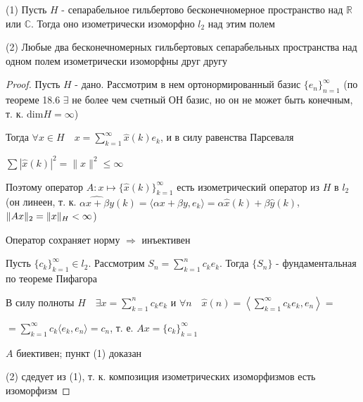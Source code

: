 \documentclass[a4paper,12pt]{report}
\newcommand*{\hm}[1]{#1\nobreak\discretionary{}%
            {\hbox{$\mathsurround=0pt #1$}}{}}
\begin{document}
\begin{thm}
(1) Пусть $H$ - сепарабельное гильбертово бесконечномерное пространство над $\mathbb R$ или $\mathbb C$. Тогда оно изометрически изоморфно $l_2$ над этим полем

(2) Любые два бесконечномерных гильбертовых сепарабельных пространства над одном полем изометрически изоморфны друг другу
\end{thm}
\begin{proof}
Пусть $H$ - дано. Рассмотрим в нем ортонормированный базис $\{e_n\}_{n=1}^\infty$ (по теореме 18.6 $\exists$ не более чем счетный ОН базис, но он не может быть конечным, т. к. $\mathrm{dim}H=\infty$)

Тогда $\forall x\in H\quad x=\sum\limits_{k=1}^\infty\hat x(k)e_k$, и в силу равенства Парсеваля 

$\sum|\hat x(k)|^2=\|x\|^2\le\infty$

Поэтому оператор $A\colon x\mapsto\{\hat x(k)\}_{k=1}^\infty$ есть изометрический оператор из $H$ в $l_2$ (он линеен, т. к. $\widehat{\alpha x+\beta y}(k)=\langle\alpha x+\beta y,e_k\rangle=\alpha\hat x(k)+\beta\hat y(k)$, $\|Ax\|_2\hm=\|x\|_H<\infty$)

Оператор сохраняет норму $\Rightarrow$ инъективен

Пусть $\{c_k\}_{k=1}^\infty\in l_2$. Рассмотрим $S_n=\sum\limits_{k=1}^n c_k e_k$. Тогда $\{S_n\}$ - фундаментальная по теореме Пифагора

В силу полноты $H\quad\exists x=\sum\limits_{k=1}^n c_k e_k$ и $\forall n\quad\hat x(n)=\left\langle\sum\limits_{k=1}^\infty c_k e_k,e_n\right\rangle=$

\noindent $=\sum\limits_{k=1}^\infty c_k\langle e_k,e_n\rangle=c_n$, т. е. $Ax=\{c_k\}_{k=1}^\infty$

$A$ биективен; пункт (1) доказан

(2) сдедует из (1), т. к. композиция изометрических изоморфизмов есть изоморфизм
\end{proof}
 
\end{document}
